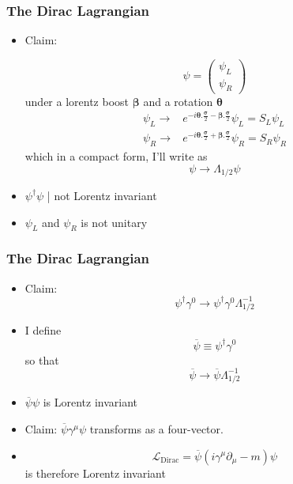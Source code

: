 \documentclass{beamer}
\begin{document}
\begin{frame}
	\frametitle{The Dirac Lagrangian}
	\begin{itemize}
		\item Claim: 

\[
\psi=\left(\begin{array}{c}
\psi_{L}\\
\psi_{R}
\end{array}\right)
\]
under a lorentz boost $\mathbf{\beta}$ and a rotation $\mathbf{\theta}$
\pause
\[
\begin{aligned}\psi_{L}\rightarrow & e^{-i\mathbf{\theta}.\frac{\mathbf{\sigma}}{2}-\mathbf{\beta}.\frac{\mathbf{\sigma}}{2}}\psi_{L}=S_{L}\psi_{L}\\
\psi_{R}\rightarrow & e^{-i\mathbf{\theta}.\frac{\mathbf{\sigma}}{2}+\mathbf{\beta}.\frac{\mathbf{\sigma}}{2}}\psi_{R}=S_{R}\psi_{R}
\end{aligned}
\]
\pause
which in a compact form, I'll write as
\[
\psi\rightarrow\Lambda_{1/2}\psi
\]

		\item $\psi^{\dagger}\psi$ \pause | not Lorentz invariant
		\pause
		\item $\psi_{L}$ and $\psi_{R}$ is not unitary
	\end{itemize}
\end{frame}


\begin{frame}
	\frametitle{The Dirac Lagrangian}
	\begin{itemize}
		\item Claim: 
\[
\psi^{\dagger}\gamma^{0}\rightarrow\psi^{\dagger}\gamma^{0}\Lambda_{1/2}^{-1}
\]
\pause
		\item I define		
\[
\overline{\psi}\equiv\psi^{\dagger}\gamma^{0}
\]
so that
\pause
\[
\overline{\psi}\rightarrow\overline{\psi}\Lambda_{1/2}^{-1}
\]
\pause
		\item $\overline{\psi}\psi$ is Lorentz invariant
		\pause
		\item Claim: $\overline{\psi}\gamma^{\mu}\psi$ transforms as a four-vector.
		\pause
		\item 
\[
\mathcal{L}_{\text{Dirac}}=\overline{\psi}(i\gamma^{\mu}\partial_{\mu}-m)\psi
\]
		\pause
		is therefore Lorentz invariant

	\end{itemize}
\end{frame}
\end{document}
